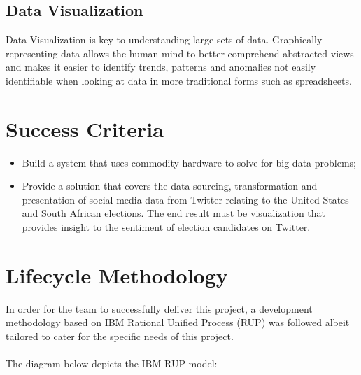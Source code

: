 \documentclass[12pt]{article} %
\begin{document}
	\subsection{Data Visualization}
	
	Data Visualization is key to understanding large sets of data. Graphically representing  data allows the human mind to better comprehend abstracted views and makes it easier to identify trends, patterns and anomalies not easily identifiable when looking at data in more traditional forms such as spreadsheets.
		
	
		\section{Success Criteria} %
		
		\begin{itemize}
			\item Build a system that uses commodity hardware to solve for big data problems;
			\item Provide a solution that covers the data sourcing, transformation and presentation of social media data from Twitter relating to the United States and South African elections. The end result must be visualization that provides insight to the sentiment of election candidates on Twitter.
		\end{itemize}
		

	
	\section{Lifecycle Methodology}
	
	
	In order for the team to successfully deliver this project, a development methodology based on IBM Rational Unified Process (RUP) was followed albeit tailored to cater for the specific needs of this project.\\
	\\
	The diagram below depicts the IBM RUP model:
	
\end{document}
